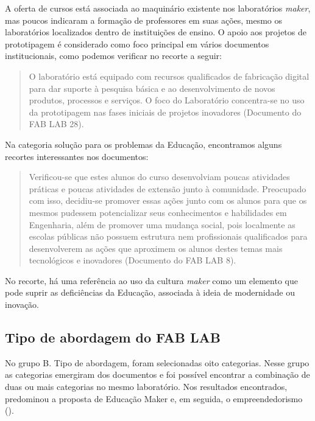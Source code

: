 \documentclass[portuguese]{textolivre}
\begin{document}
A oferta de cursos está associada ao maquinário existente nos laboratórios \textit{maker}, mas poucos indicaram a formação de professores em suas ações, mesmo os laboratórios localizados dentro de instituições de ensino. O apoio aos projetos de prototipagem é considerado como foco principal em vários documentos institucionais, como podemos verificar no recorte a seguir:

\begin{quote}
    O laboratório está equipado com recursos qualificados de fabricação digital para dar suporte à pesquisa básica e ao desenvolvimento de novos produtos, processos e serviços. O foco do Laboratório concentra-se no uso da prototipagem nas fases iniciais de projetos inovadores (Documento do FAB LAB 28).
\end{quote}

Na categoria solução para os problemas da Educação, encontramos alguns recortes interessantes nos documentos:

\begin{quote}
    Verificou-se que estes alunos do curso desenvolviam poucas atividades práticas e poucas atividades de extensão junto à comunidade. Preocupado com isso, decidiu-se promover essas ações junto com os alunos para que os mesmos pudessem potencializar seus conhecimentos e habilidades em Engenharia, além de promover uma mudança social, pois localmente as escolas públicas não possuem estrutura nem profissionais qualificados para desenvolverem as ações que aproximem os alunos destes temas mais tecnológicos e inovadores (Documento do FAB LAB 8).
\end{quote}

No recorte, há uma referência ao uso da cultura \textit{maker} como um elemento que pode suprir as deficiências da Educação, associada à ideia de modernidade ou inovação.

\subsection{Tipo de abordagem do FAB LAB}\label{sec-modelo}
No grupo B. Tipo de abordagem, foram selecionadas oito categorias. Nesse grupo as categorias emergiram dos documentos e foi possível encontrar a combinação de duas ou mais categorias no mesmo laboratório. Nos resultados encontrados, predominou a proposta de Educação Maker e, em seguida, o empreendedorismo ().
\end{document}
